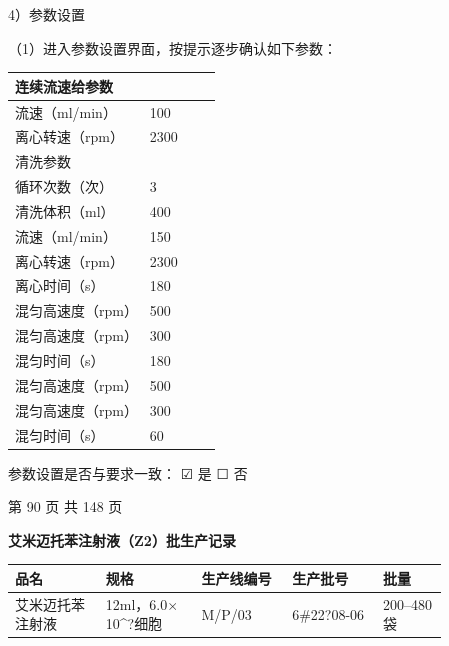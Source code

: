\documentclass[UTF8,10pt,a4paper,fontset=fandol]{ctexart}
\newcommand{\fieldvalue}[1]{#1}
\newcommand{\handwritten}[1]{#1}
\newcommand{\checkboxfield}[1]{\ifstrequal{#1}{checked}{☑}{\ifstrequal{#1}{unclear}{?}{☐}}}
\begin{document}
\vspace{0.5em}

4）参数设置

（1）进入参数设置界面，按提示逐步确认如下参数：

\begin{tabular}{|p{0.25\linewidth}|p{0.16\linewidth}|}
\hline
连续流速给参数 & \\
\hline
流速（ml/min） & 100 \\
\hline
离心转速（rpm） & 2300 \\
\hline
清洗参数 & \\
\hline
循环次数（次） & 3 \\
\hline
清洗体积（ml） & 400 \\
\hline
流速（ml/min） & 150 \\
\hline
离心转速（rpm） & 2300 \\
\hline
离心时间（s） & 180 \\
\hline
混匀高速度（rpm） & 500 \\
\hline
混匀高速度（rpm） & 300 \\
\hline
混匀时间（s） & 180 \\
\hline
混匀高速度（rpm） & 500 \\
\hline
混匀高速度（rpm） & 300 \\
\hline
混匀时间（s） & 60 \\
\hline
\end{tabular}

\vspace{1em}

参数设置是否与要求一致：
\fieldvalue{\handwritten{\checkboxfield{checked}}} 是 \quad
\fieldvalue{\checkboxfield{unchecked}} 否

\hfill 第 90 页 共 148 页

\newpage

\begin{center}
\textbf{艾米迈托苯注射液（Z2）批生产记录}
\end{center}

\begin{center}
\small
\begin{tabular}{|p{0.18\linewidth}|p{0.19\linewidth}|p{0.18\linewidth}|p{0.18\linewidth}|p{0.13\linewidth}|}
\hline
品名 & 规格 & 生产线编号 & 生产批号 & 批量 \\ \hline
艾米迈托苯注射液 & 12ml，6.0$\times$10^{?}细胞 &
\fieldvalue{\handwritten{M/P/03}} &
\fieldvalue{\handwritten{6\#22?08-06}} &
200--480袋 \\ \hline
\end{tabular}
\end{center}
\end{document}

